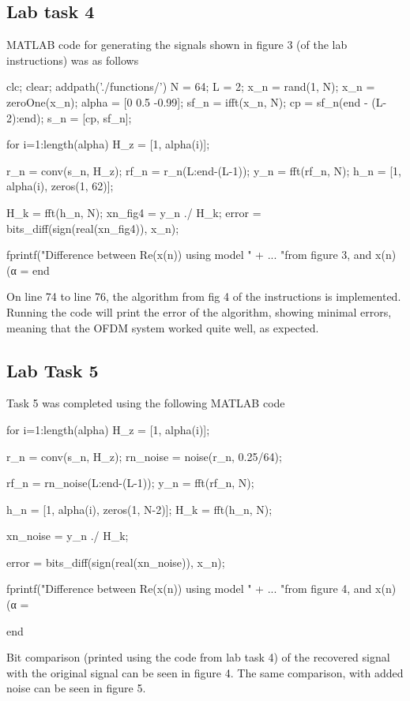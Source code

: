 \documentclass[a4paper,11pt]{article}
\begin{document}
\subsection{Lab task 4}
MATLAB code for generating the signals shown in figure 3 (of the lab instructions) was as follows 
\begin{ffcode}
clc; clear; addpath('./functions/')
N = 64;
L = 2;
x_n = rand(1, N);
x_n = zeroOne(x_n);
alpha = [0 0.5 -0.99];
sf_n = ifft(x_n, N);
cp = sf_n(end - (L-2):end);
s_n = [cp, sf_n];

for i=1:length(alpha)
    H_z = [1, alpha(i)];

    r_n = conv(s_n, H_z);
    rf_n = r_n(L:end-(L-1));
    y_n = fft(rf_n, N);
    h_n = [1, alpha(i), zeros(1, 62)];

    H_k = fft(h_n, N);
    xn_fig4 = y_n ./ H_k;
    error = bits_diff(sign(real(xn_fig4)), x_n);

    fprintf("Difference between Re(x(n)) using model " + ...
        "from figure 3, and x(n) (α = %
end
\end{ffcode}

On line 74 to line 76, the algorithm from fig 4 of the instructions is implemented. Running the code will print the error of the algorithm, showing minimal errors, meaning that the OFDM system worked quite well, as expected.
\subsection{Lab Task 5}
Task 5 was completed using the following MATLAB code
\begin{ffcode}
for i=1:length(alpha)
    H_z = [1, alpha(i)];

    r_n = conv(s_n, H_z);
    rn_noise = noise(r_n, 0.25/64);

    rf_n = rn_noise(L:end-(L-1));
    y_n = fft(rf_n, N);
    
    h_n = [1, alpha(i), zeros(1, N-2)];
    H_k = fft(h_n, N);

    xn_noise = y_n ./ H_k;

    error = bits_diff(sign(real(xn_noise)), x_n);
    
    fprintf("Difference between Re(x(n)) using model " + ...
         "from figure 4, and x(n) (α = %

end
\end{ffcode}

Bit comparison (printed using the code from lab task 4) of the recovered signal with the original signal can be seen in figure 4. The same comparison, with added noise can be seen in figure 5.
\end{document}

